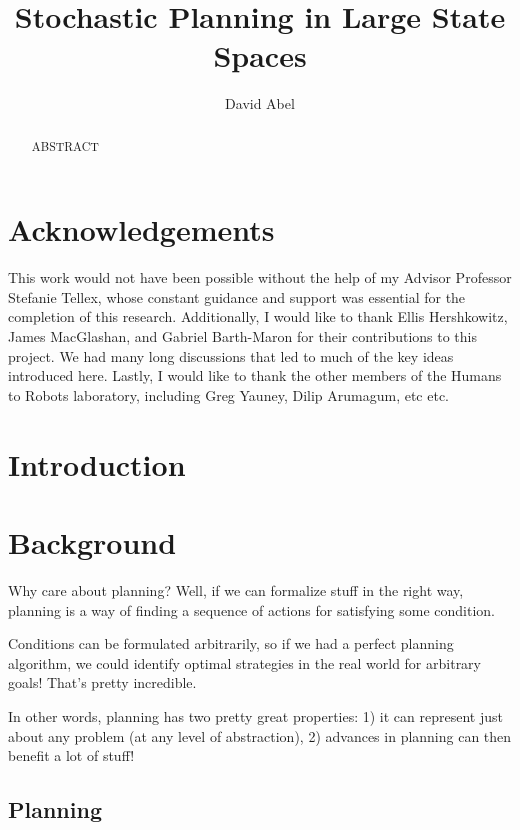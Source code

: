 \documentclass[11pt]{article}
\title{Stochastic Planning in Large State Spaces}
\author{David Abel}
\date{}
\begin{document}
\maketitle

\newpage

\begin{abstract}
ABSTRACT
\end{abstract}

\newpage

\section*{Acknowledgements}
This work would not have been possible without the help of my Advisor Professor Stefanie Tellex, whose constant guidance and support was essential for the completion of this research. Additionally, I would like to thank Ellis Hershkowitz, James MacGlashan, and Gabriel Barth-Maron for their contributions to this project. We had many long discussions that led to much of the key ideas introduced here. Lastly, I would like to thank the other members of the Humans to Robots laboratory, including Greg Yauney, Dilip Arumagum, etc etc.

\newpage

\tableofcontents

\newpage

\section{Introduction}

\section{Background}

Why care about planning? Well, if we can formalize stuff in the right way, planning is a way of finding a sequence of actions for satisfying some condition.

Conditions can be formulated arbitrarily, so if we had a perfect planning algorithm, we could identify optimal strategies in the real world for arbitrary goals! That's pretty incredible.

In other words, planning has two pretty great properties: 1) it can represent just about any problem (at any level of abstraction), 2) advances in planning can then benefit a lot of stuff!

\subsection{Planning}
\end{document}
